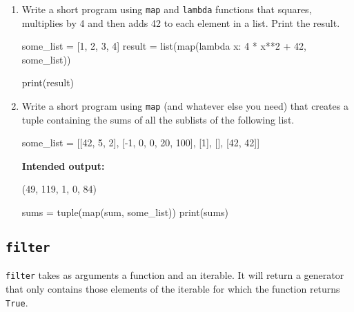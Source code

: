 \begin{enumerate}
    \item Write a short program using {\tt map} and {\tt lambda} functions that squares, multiplies by 4 and then adds 42 to each element in a list. Print the result.

    \vspace{1em}
    \begin{solution}
        \begin{pythoncode}
some_list = [1, 2, 3, 4]
result = list(map(lambda x: 4 * x**2 + 42, some_list))

print(result)
        \end{pythoncode}
    \end{solution}

    \item Write a short program using {\tt map} (and whatever else you need) that creates a tuple containing the sums of all the sublists of the following list.

    \begin{pythoncode}
some_list = [[42, 5, 2], [-1, 0, 0, 20, 100], [1], [], [42, 42]]
    \end{pythoncode}

    {\bf Intended output:}

    \begin{outputcode}
(49, 119, 1, 0, 84)
    \end{outputcode}

    \begin{solution}
        \begin{pythoncode}
sums = tuple(map(sum, some_list))
print(sums)
        \end{pythoncode}
    \end{solution}
\end{enumerate}

\subsection{{\tt filter}}

{\tt filter} takes as arguments a function and an iterable. It will return a generator that only contains those elements of the iterable for which the function returns {\tt True}.

